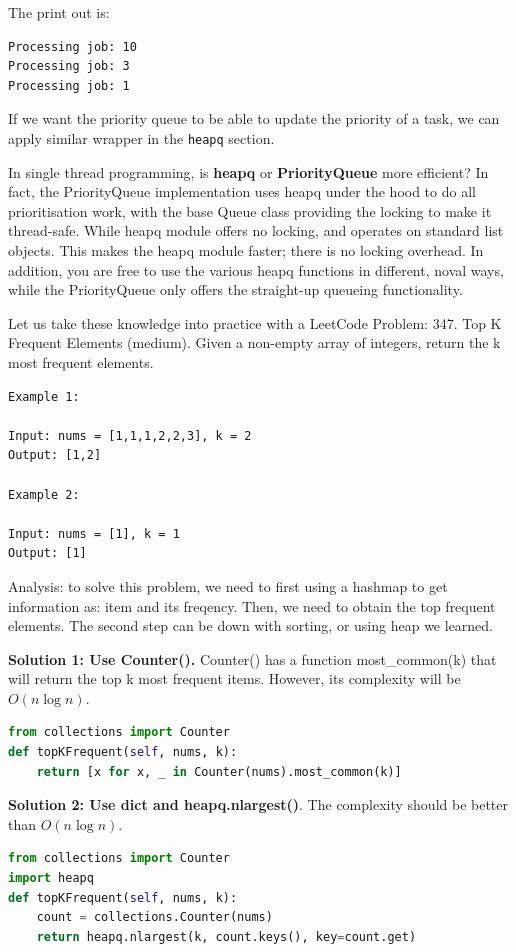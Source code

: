 \documentclass[main.tex]{subfiles}
\begin{document}
The print out is:
\begin{lstlisting}
Processing job: 10
Processing job: 3
Processing job: 1
\end{lstlisting}
If we want the priority queue to be able to update the priority of a task, we can apply similar wrapper in the \texttt{heapq} section. 
\begin{bclogo}[couleur = blue!30, arrondi=0.1,logo=\bccrayon,ombre=true]{In single thread programming, is \textbf{heapq} or \textbf{PriorityQueue} more efficient?} In fact, the PriorityQueue implementation uses heapq under the hood to do all prioritisation work, with the base Queue class providing the locking to make it thread-safe. While heapq module offers no locking, and operates on standard list objects. This makes the heapq module faster; there is no locking overhead. In addition, you are free to use the various heapq functions in different, noval ways, while the PriorityQueue only offers the straight-up queueing functionality. 
\end{bclogo}
Let us take these knowledge into practice with a LeetCode Problem:
347. Top K Frequent Elements (medium). Given a non-empty array of integers, return the k most frequent elements.
\begin{lstlisting}[numbers=none]
Example 1:

Input: nums = [1,1,1,2,2,3], k = 2
Output: [1,2]

Example 2:

Input: nums = [1], k = 1
Output: [1]
\end{lstlisting}

Analysis: to solve this problem, we need to first using a hashmap to get information as: item and its freqency. Then, we need to obtain the top frequent elements. The second step can be down with sorting, or using heap we learned.

\textbf{Solution 1: Use Counter().} Counter() has a function most\_common(k) that will return the top k most frequent items. However, its complexity will be $O(n \log n)$. 
\begin{lstlisting}[language=Python]
from collections import Counter
def topKFrequent(self, nums, k):
    return [x for x, _ in Counter(nums).most_common(k)]
\end{lstlisting}

\textbf{Solution 2: Use dict and heapq.nlargest()}. The complexity should be better than $O(n \log n)$. 
\begin{lstlisting}[language=Python]
from collections import Counter
import heapq
def topKFrequent(self, nums, k):
    count = collections.Counter(nums)   
    return heapq.nlargest(k, count.keys(), key=count.get) 
\end{lstlisting}
\end{document}
